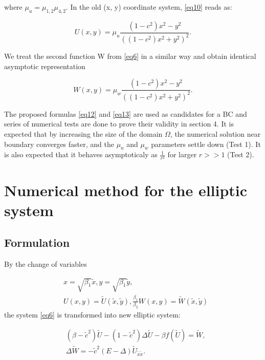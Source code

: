 \documentclass[12pt]{article}
\theoremstyle{theorem}
\theoremstyle{defi}
\begin{document}
where $\mu_u = \mu_{1,2} \mu_{4,2}$. In the old (x, y) coordinate system, \eqref{eq10}  reads as:

\begin{equation}
U(x,y) = \mu_u \frac{(1-c^2)x^2 - y^2}{ ( (1-c^2)x^2 + y^2 )^2 }. \label{eq12}
\end{equation}

We treat the second function W from \eqref{eq6}  in a similar way and obtain identical asymptotic representation

\begin{equation}
W(x,y) = \mu_w \frac{(1-c^2)x^2 - y^2}{ ( (1-c^2)x^2 + y^2 )^2 }. \label{eq13}
\end{equation}


The proposed formulas \eqref{eq12} and \eqref{eq13} are used as candidates for a BC and series of numerical tests are done to prove their validity in section 4. 
It is expected that by increasing the size of the domain $\Omega$, the numerical solution near boundary converges faster, and the $\mu_u$ and $\mu_w$ parameters settle down (Test 1). It is also expected that it behaves asymptoticaly as $\frac{1}{r^2}$ for larger $r >> 1$ (Test 2).

\section{Numerical method for the elliptic system}

\subsection{Formulation}


By the change of variables

\begin{equation}\label{eqVCN}
\begin{split}
&x=\sqrt{\beta_1} { \tilde{x} }, y=\sqrt{\beta_1} { \tilde{ y} },\\
&U(x,y)= \tilde U({ \tilde{x} },{ \tilde{y} } ), \frac{\beta_1}{\beta_2} W(x,y)=  \tilde W({ \tilde{x} },{ \tilde{y} } )
\end{split}
\end{equation}
 the system \eqref{eq6} is transformed into new elliptic system:

\begin{equation}\label{eq31}
\begin{split}
&(\beta-\tilde c ^2) \tilde U  -(1- \tilde c^2) \Delta \tilde U - \beta f( \tilde U ) = \tilde W, \\
&\Delta \tilde W =  - \tilde c^2 (E- \Delta) \tilde U_{\tilde x \tilde x}. 
\end{split}
\end{equation}
\end{document}
